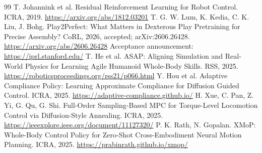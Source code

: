 \documentclass[11pt]{article}
\begin{document}
\begin{thebibliography}{99}
 T. Johannink et al. Residual Reinforcement Learning for Robot Control. ICRA, 2019. \url{https://arxiv.org/abs/1812.03201}
 T. G. W. Lum, K. Kedia, C. K. Liu, J. Bohg. Play2Perfect: What Matters in Dexterous Play Pretraining for Precise Assembly? CoRL, 2026, accepted; arXiv:2606.26428. \url{https://arxiv.org/abs/2606.26428} Acceptance announcement: \url{https://iprl.stanford.edu/}
 T. He et al. ASAP: Aligning Simulation and Real-World Physics for Learning Agile Humanoid Whole-Body Skills. RSS, 2025. \url{https://roboticsproceedings.org/rss21/p066.html}
 Y. Hou et al. Adaptive Compliance Policy: Learning Approximate Compliance for Diffusion Guided Control. ICRA, 2025. \url{https://adaptive-compliance.github.io/}
 H. Xue, C. Pan, Z. Yi, G. Qu, G. Shi. Full-Order Sampling-Based MPC for Torque-Level Locomotion Control via Diffusion-Style Annealing. ICRA, 2025. \url{https://ieeexplore.ieee.org/document/11127320/}
 P. K. Rath, N. Gopalan. XMoP: Whole-Body Control Policy for Zero-Shot Cross-Embodiment Neural Motion Planning. ICRA, 2025. \url{https://prabinrath.github.io/xmop/}
\end{thebibliography}
\end{document}
